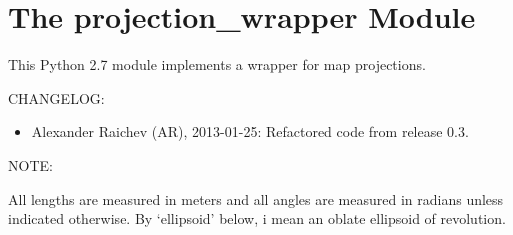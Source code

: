 \documentclass[a4paper,12ptopenany,oneside]{sphinxmanual}
\begin{document}
\chapter{The projection\_wrapper Module}
\label{projection_wrapper:the-projection-wrapper-module}\label{projection_wrapper:module-projection_wrapper}\label{projection_wrapper::doc}
This Python 2.7 module implements a wrapper for map projections.

CHANGELOG:
\begin{itemize}
\item {} 
Alexander Raichev (AR), 2013-01-25: Refactored code from release 0.3.

\end{itemize}

NOTE:

All lengths are measured in meters and all angles are measured in radians 
unless indicated otherwise. 
By `ellipsoid' below, i mean an oblate ellipsoid of revolution.
\end{document}
